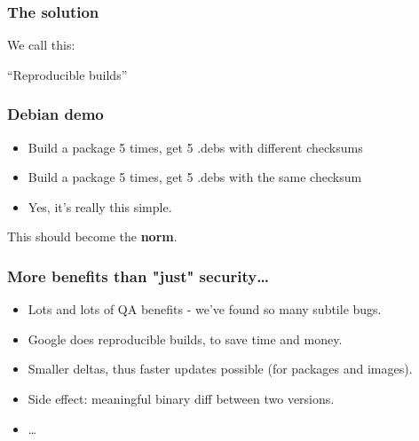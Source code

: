 \documentclass[14pt,aspectratio=169]{beamer}
\newif\ifplacelogo
\begin{document}
\begin{frame}
 \frametitle{The solution}

 \begin{center}
 We call this:

 \Huge{ “Reproducible builds” }
 \end{center}
\end{frame}

\placelogotrue

\begin{frame}
 \frametitle{Debian demo}
 \begin{itemize}
 \item Build a package 5 times, get 5 .debs with different checksums
 \item<2-3> Build a package 5 times, get 5 .debs with the same checksum\\
 \item<3>{Yes, it's really this simple.}
 \end{itemize}
%
%
\end{frame}

\placelogofalse

\begin{frame}[plain]
\begin{center}
 \Huge{This should become the \textbf{norm}.}

\end{center}
\end{frame}

\begin{frame}[fragile]
 \frametitle{More benefits than "just" security…}
 \begin{itemize}
  \item Lots and lots of QA benefits - we've found so many subtile bugs.
  \item<2-5> Google does reproducible builds, to save time and money.
  \item<3-5> Smaller deltas, thus faster updates possible (for packages and
  images).
  \item<4-5> Side effect: meaningful binary diff between two versions.
  \item<5> …
 \end{itemize}
\end{frame}
\end{document}
